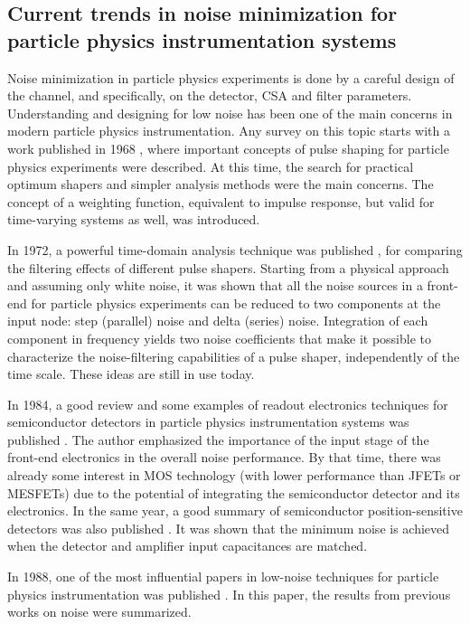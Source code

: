 \subsection{Current trends in noise minimization for particle physics instrumentation systems}
Noise minimization in particle physics experiments is done by a careful design of the channel, and specifically, on the detector, CSA and filter parameters. Understanding and designing for low noise has been one of the main concerns in modern particle physics instrumentation. Any survey on this topic starts with a work published in 1968 \citep{radeka104}, where important concepts of pulse shaping for particle physics experiments were described. At this time, the search for practical optimum shapers and simpler analysis methods were the main concerns. The concept of a weighting function, equivalent to impulse response, but valid for time-varying systems as well, was introduced.

In 1972, a powerful time-domain analysis technique was published \citep{goulding101}, for comparing the filtering effects of different pulse shapers. Starting from a physical approach and assuming only white noise, it was shown that all the noise sources in a front-end for particle physics experiments can be reduced to two components at the input node: step (parallel) noise and delta (series) noise. Integration of each component in frequency yields two noise coefficients that make it possible to characterize the noise-filtering capabilities of a pulse shaper, independently of the time scale. These ideas are still in use today.

In 1984, a good review and some examples of readout electronics techniques for semiconductor detectors in particle physics instrumentation systems was published \citep{gatti103}. The author emphasized the importance of the input stage of the front-end electronics in the overall noise performance. By that time, there was already some interest in MOS technology (with lower performance than JFETs or MESFETs) due to the potential of integrating the semiconductor detector and its electronics. In the same year, a good summary of semiconductor position-sensitive detectors was also published \citep{radeka105}. It was shown that the minimum noise is achieved when the detector and amplifier input capacitances are matched.

In 1988, one of the most influential papers in low-noise techniques for particle physics instrumentation was published \citep{radeka101}. In this paper, the results from previous works on noise were summarized.

